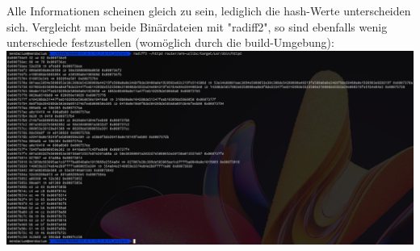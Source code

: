 \documentclass{article}
\begin{document}
	\pagebreak
	
	\noindent Alle Informationen scheinen gleich zu sein, lediglich die hash-Werte unterscheiden sich. Vergleicht man beide Binärdateien mit "radiff2", so sind ebenfalls wenig unterschiede festzustellen (womöglich durch die build-Umgebung):\\
	\includegraphics[width=0.7\linewidth]{"pictures/1.8 httpd compare2"}
	
\end{document}
